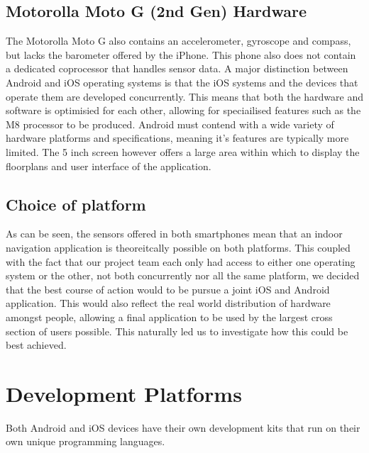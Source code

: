 \documentclass[main.tex]{subfiles}
\begin{document}
\subsection*{Motorolla Moto G (2nd Gen) Hardware}

The Motorolla Moto G also contains an accelerometer, gyroscope and compass, but lacks the barometer offered by the iPhone. This phone also does not contain a dedicated coprocessor that handles sensor data. A major distinction between Android and iOS operating systems is that the iOS systems and the devices that operate them are developed concurrently. This means that both the hardware and software is optimisied for each other, allowing for speciailised features such as the M8 processor to be produced. Android must contend with a wide variety of hardware platforms and specifications, meaning it's features are typically more limited. The 5 inch screen however offers a large area within which to display the floorplans and user interface of the application.

\subsection*{Choice of platform}

As can be seen, the sensors offered in both smartphones mean that an indoor navigation application is theoreitcally possible on both platforms. This coupled with the fact that our project team each only had access to either one operating system or the other, not both concurrently nor all the same platform, we decided that the best course of action would to be pursue a joint iOS and Android application. This would also reflect the real world distribution of hardware amongst people, allowing a final application to be used by the largest cross section of users possible. This naturally led us to investigate how this could be best achieved.

\section*{Development Platforms}

Both Android and iOS devices have their own development kits that run on their own unique programming languages.
\end{document}
